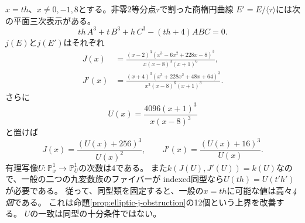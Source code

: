 \begin{theorem}[商曲線の方程式と強化された同型障害]\label{thm:explicit-two-isogeny}
$x=th$、$x\ne0,-1,8$とする。非零2等分点$\tau$で割った商楕円曲線
$E'=E/\langle\tau\rangle$には次の平面三次表示がある。
\begin{equation}\label{eq:isogenous-cubic}
 th\,A^3+t\,B^3+h\,C^3-(th+4)ABC=0.
\end{equation}
$j(E)$と$j(E')$はそれぞれ
\begin{align}
 J(x)&=\frac{(x-2)^3(x^3-6x^2+228x-8)^3}
                    {x(x-8)^3(x+1)^6},\label{eq:source-j}\\
 J'(x)&=\frac{(x+4)^3(x^3+228x^2+48x+64)^3}
                    {x^2(x-8)^6(x+1)^3}.\label{eq:isogenous-j}
\end{align}
さらに
\begin{equation}\label{eq:isogeny-modular-u}
 U(x)=\frac{4096(x+1)^3}{x(x-8)^3}
\end{equation}
と置けば
\begin{equation}\label{eq:2-isogeny-modular-forms}
 J(x)=\frac{(U(x)+256)^3}{U(x)^2},\qquad
 J'(x)=\frac{(U(x)+16)^3}{U(x)}.
\end{equation}
有理写像$U:\mathbb P^1_x\to\mathbb P^1_U$の次数は4である。
また$k(J(U),J'(U))=k(U)$なので、一般の二つの九変数族のファイバーが
indexed同型なら$U(th)=U(t'h')$が必要である。
従って、同型類を固定すると、一般の$x=th$に可能な値は高々\emph{4個}である。
これは命題\ref{prop:elliptic-j-obstruction}の12個という上界を改善する。
$U$の一致は同型の十分条件ではない。
\end{theorem}
